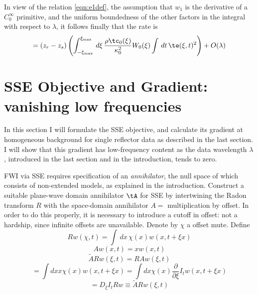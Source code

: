 In view of the relation \ref{eqn:e1def}, the assumption that $w_1$ is
the derivative of a $C_0^{\infty}$ primitive, and the uniform boundedness of
the other factors in the integral with respect to $\lambda$, it
follows finally that the rate is
\begin{equation}
  \label{eqn:dttwri}
  =(z_r-z_s) \left(\int_{-\xi_{\rm max}}^{\xi_{\rm max}}\,d\xi \, \frac{\rho \tc_0(\xi)}{\kappa_0^2} W_0(\xi) 
    \int\,dt\, \te(\xi,t)^2\right) + O(\lambda)
\end{equation}








\section{SSE Objective and Gradient: vanishing low frequencies}
In this section I will formulate the SSE objective, and calculate its
gradient at homogeneous background for single reflector data as
described in the last section. I will show that this gradient has
low-frequency content as the data wavelength $\lambda$, introduced in
the last section and in the introduction, tends to zero. 

FWI via SSE requires specification of an {\em annihilator}, the null
space of which consists of non-extended models, as explained in the
introduction.  Construct a suitable plane-wave domain annihilator
$\tA$ for
SSE by intertwining the Radon transform $R$ with the space-domain
annihilator $A = $ multiplication by offset. In order to do this
properly, it is necessary to introduce a cutoff in offset: not a
hardship, since infinite offsets are unavailable. Denote by $\chi$ a
offset mute. Define
\[
Rw(\chi,t) = \int \,dx\,\chi(x) w(x,t+\xi x)
\]
\[
Aw(x,t)=x w(x,t)
\]
\[
\tilde{A} Rw (\xi,t) = R Aw (\xi,t)
\]
\[
=\int dx x \chi(x) w(x,t+\xi x) = \int dx \chi(x)\frac{\partial}{\partial \xi}
I_tw(x,t+\xi x)
\]
\[
= D_{\xi} I_t R  w \equiv \tilde{A} Rw (\xi,t) 
\]

